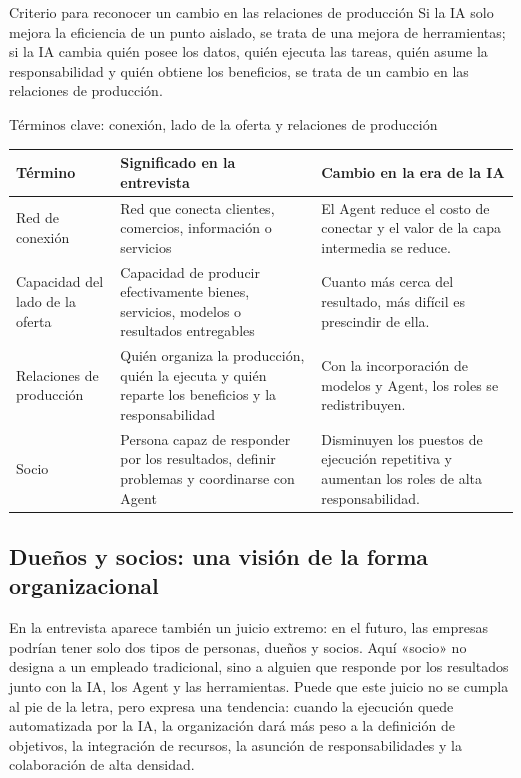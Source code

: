 \documentclass[a4paper]{article}
\begin{document}
\begin{importantbox}{Criterio para reconocer un cambio en las relaciones de producción}
Si la IA solo mejora la eficiencia de un punto aislado, se trata de una mejora de herramientas; si la IA cambia quién posee los datos, quién ejecuta las tareas, quién asume la responsabilidad y quién obtiene los beneficios, se trata de un cambio en las relaciones de producción.
\end{importantbox}

\begin{knowledgebox}{Términos clave: conexión, lado de la oferta y relaciones de producción}
\begin{tabularx}{\textwidth}{p{}p{}X}
\toprule
Término & Significado en la entrevista & Cambio en la era de la IA \\
\midrule
Red de conexión & Red que conecta clientes, comercios, información o servicios & El Agent reduce el costo de conectar y el valor de la capa intermedia se reduce. \\
Capacidad del lado de la oferta & Capacidad de producir efectivamente bienes, servicios, modelos o resultados entregables & Cuanto más cerca del resultado, más difícil es prescindir de ella. \\
Relaciones de producción & Quién organiza la producción, quién la ejecuta y quién reparte los beneficios y la responsabilidad & Con la incorporación de modelos y Agent, los roles se redistribuyen. \\
Socio & Persona capaz de responder por los resultados, definir problemas y coordinarse con Agent & Disminuyen los puestos de ejecución repetitiva y aumentan los roles de alta responsabilidad. \\
\bottomrule
\end{tabularx}
\end{knowledgebox}

\subsection{Dueños y socios: una visión de la forma organizacional}

En la entrevista aparece también un juicio extremo: en el futuro, las empresas podrían tener solo dos tipos de personas, dueños y socios. Aquí «socio» no designa a un empleado tradicional, sino a alguien que responde por los resultados junto con la IA, los Agent y las herramientas. Puede que este juicio no se cumpla al pie de la letra, pero expresa una tendencia: cuando la ejecución quede automatizada por la IA, la organización dará más peso a la definición de objetivos, la integración de recursos, la asunción de responsabilidades y la colaboración de alta densidad.
\end{document}
